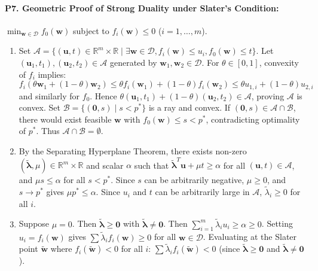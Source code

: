 \paragraph{P7. Geometric Proof of Strong Duality under Slater's Condition:}
$\min_{\mathbf{w} \in \mathcal{D}} f_0(\mathbf{w})$ subject to $f_i(\mathbf{w}) \le 0$ ($i = 1, \dots, m$).
\begin{enumerate}[label=(\alph*)]
    \item Set $\mathcal{A} = \{(\mathbf{u}, t) \in \mathbb{R}^m \times \mathbb{R} \mid \exists \mathbf{w} \in \mathcal{D}, f_i(\mathbf{w}) \le u_i, f_0(\mathbf{w}) \le t\}$.
    Let $(\mathbf{u}_1, t_1), (\mathbf{u}_2, t_2) \in \mathcal{A}$ generated by $\mathbf{w}_1, \mathbf{w}_2 \in \mathcal{D}$. For $\theta \in [0, 1]$, convexity of $f_i$ implies:
    \begin{equation*}
    f_i(\theta \mathbf{w}_1 + (1-\theta)\mathbf{w}_2) \le \theta f_i(\mathbf{w}_1) + (1-\theta)f_i(\mathbf{w}_2) \le \theta u_{1, i} + (1-\theta)u_{2, i}
    \end{equation*}
    and similarly for $f_0$. Hence $\theta(\mathbf{u}_1, t_1) + (1-\theta)(\mathbf{u}_2, t_2) \in \mathcal{A}$, proving $\mathcal{A}$ is convex.
    Set $\mathcal{B} = \{(\mathbf{0}, s) \mid s < p^*\}$ is a ray and convex.
    If $(\mathbf{0}, s) \in \mathcal{A} \cap \mathcal{B}$, there would exist feasible $\mathbf{w}$ with $f_0(\mathbf{w}) \le s < p^*$, contradicting optimality of $p^*$. Thus $\mathcal{A} \cap \mathcal{B} = \emptyset$.
    \item By the Separating Hyperplane Theorem, there exists non-zero $(\tilde{\boldsymbol{\lambda}}, \mu) \in \mathbb{R}^m \times \mathbb{R}$ and scalar $\alpha$ such that $\tilde{\boldsymbol{\lambda}}^T \mathbf{u} + \mu t \ge \alpha$ for all $(\mathbf{u}, t) \in \mathcal{A}$, and $\mu s \le \alpha$ for all $s < p^*$.
    Since $s$ can be arbitrarily negative, $\mu \ge 0$, and $s \to p^*$ gives $\mu p^* \le \alpha$.
    Since $u_i$ and $t$ can be arbitrarily large in $\mathcal{A}$, $\tilde{\lambda}_i \ge 0$ for all $i$.
    \item Suppose $\mu = 0$. Then $\tilde{\boldsymbol{\lambda}} \ge \mathbf{0}$ with $\tilde{\boldsymbol{\lambda}} \ne \mathbf{0}$.
    Then $\sum_{i=1}^m \tilde{\lambda}_i u_i \ge \alpha \ge 0$. Setting $u_i = f_i(\mathbf{w})$ gives $\sum \tilde{\lambda}_i f_i(\mathbf{w}) \ge 0$ for all $\mathbf{w} \in \mathcal{D}$.
    Evaluating at the Slater point $\tilde{\mathbf{w}}$ where $f_i(\tilde{\mathbf{w}}) < 0$ for all $i$:
    $\sum \tilde{\lambda}_i f_i(\tilde{\mathbf{w}}) < 0$ (since $\tilde{\boldsymbol{\lambda}} \ge \mathbf{0}$ and $\tilde{\boldsymbol{\lambda}} \ne \mathbf{0}$).

\end{enumerate}
